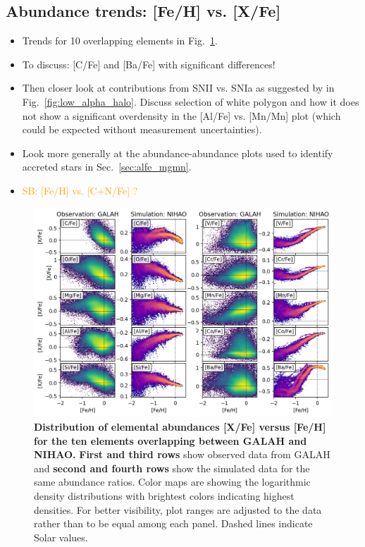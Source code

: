 \documentclass[fleqn,usenatbib]{mnras}
\newcommand{\SB}[1]{{\textcolor{orange}{SB: #1}}}
\begin{document}
\subsection{Abundance trends: [Fe/H] vs. [X/Fe]} \label{sec:feh_xfe}

\begin{itemize}
    \item Trends for 10 overlapping elements in Fig.~\ref{fig:FeH_XFe}.
    \item To discuss: [C/Fe] and [Ba/Fe] with significant differences!
    \item Then closer look at contributions from SNII vs. SNIa as suggested by \citet{Nissen2010} in Fig.~\ref{fig:low_alpha_halo}. Discuss selection of white polygon and how it does not show a significant overdensity in the [Al/Fe] vs. [Mn/Mn] plot (which could be expected without measurement uncertainties).
    \item Look more generally at the abundance-abundance plots used to identify accreted stars in Sec.~\ref{sec:alfe_mgmn}.
    \item \SB{[Fe/H] vs. [C+N/Fe] \citep{Hawkins2015}?}
\end{itemize}

\begin{figure}
	\includegraphics[width=\textwidth]{figures/Overview_FeH_XFe_Obs_Sim.png}
    \caption{
    \textbf{Distribution of elemental abundances [X/Fe] versus [Fe/H] for the ten elements overlapping between GALAH and NIHAO.} 
    \textbf{First and third rows} show observed data from GALAH and \textbf{second and fourth rows} show the simulated data for the same abundance ratios. Color maps are showing the logarithmic density distributions with brightest colors indicating highest densities. For better visibility, plot ranges are adjusted to the data rather than to be equal among each panel. Dashed lines indicate Solar values.}
    \label{fig:FeH_XFe}
\end{figure}
\end{document}
